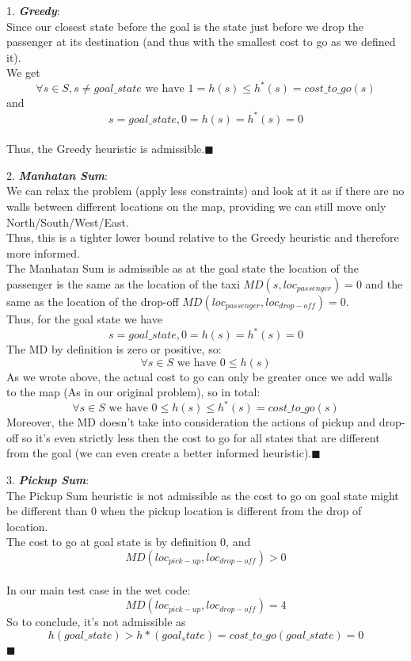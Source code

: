 \documentclass[12pt]{article}
\newcommand{\qed}{\hfill$\blacksquare$}
\begin{document}
1. {\textit{\textbf{Greedy}}}:\\
Since our closest state before the goal is the state just before we drop the passenger at its destination (and thus with the smallest cost to go as we defined it).\\
We get $$\forall s\in S, s \neq goal\_state \text{ we have } 1 = h(s) \leq h^*(s) = cost\_to\_go(s)$$ and $$s=goal\_state, 0=h(s)=h^*(s) = 0$$\\
Thus, the Greedy heuristic is admissible.\qed

2. {\textit{\textbf{Manhatan Sum}}}:\\
We can relax the problem (apply less constraints) and look at it as if there are no walls between different locations on the map, providing we can still move only North/South/West/East.\\
Thus, this is a tighter lower bound relative to the Greedy heuristic and therefore more informed.\\
The Manhatan Sum is admissible as at the goal state the location of the passenger is the same as the location of the taxi $MD(s,loc_{passenger}) = 0$ and the same as the location of the drop-off $MD(loc_{passenger},loc_{drop-off}) = 0$.\\
Thus, for the goal state we have 
$$s=goal\_state, 0=h(s)=h^*(s) = 0$$
The MD by definition is zero or positive, so:
$$\forall s\in S \text{ we have } 0 \leq h(s) $$
As we wrote above, the actual cost to go can only be greater once we add walls to the map (As in our original problem), so in total:
$$\forall s\in S \text{ we have } 0 \leq h(s) \leq h^*(s) = cost\_to\_go(s)$$
Moreover, the MD doesn't take into consideration the actions of pickup and drop-off so it's even strictly less then the cost to go for all states that are different from the goal (we can even create a better informed heuristic).\qed

3. {\textit{\textbf{Pickup Sum}}}:\\
The Pickup Sum heuristic is not admissible as the cost to go on goal state might be different than 0 when the pickup location is different from the drop of location.\\
The cost to go at goal state is by definition 0, and $$MD(loc_{pick-up},loc_{drop-off}) > 0$$\\
In our main test case in the wet code:
$$MD(loc_{pick-up},loc_{drop-off})=4$$
So to conclude, it's not admissible as $$h(goal\_state) > h*(goal_state) = cost\_to\_go(goal\_state) = 0$$
\qed
\end{document}
